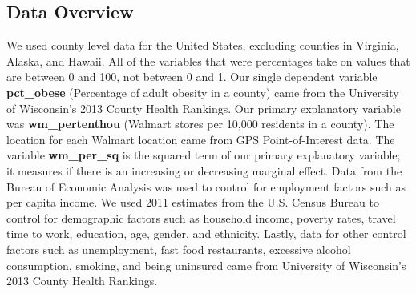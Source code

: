 \fontsize{12bp}{14bp}\selectfont
\subsection{Data Overview}
We used county level data for the United States, excluding counties in Virginia, Alaska, and Hawaii. All of the variables that were percentages take on values that are between 0 and 100, not between 0 and 1. Our single dependent variable {\textbf{pct_obese}} (Percentage of adult obesity in a county) came from the University of Wisconsin's 2013 County Health Rankings. Our primary explanatory variable was {\textbf{wm_pertenthou}} (Walmart stores per 10,000 residents in a county). The location for each Walmart location came from GPS Point-of-Interest data. The variable {\textbf{wm_per_sq}} is the squared term of our primary explanatory variable; it measures if there is an increasing or decreasing marginal effect. Data from the Bureau of Economic Analysis was used to control for employment factors such as per capita income. We used 2011 estimates from the U.S. Census Bureau to control  for demographic factors such as household income, poverty rates, travel time to work, education, age, gender, and ethnicity. Lastly, data for other control factors such as unemployment, fast food restaurants, excessive alcohol consumption, smoking, and being uninsured came from University of Wisconsin's 2013 County Health Rankings.